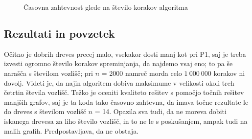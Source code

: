\documentclass[a4paper, 12 pt]{article}
\begin{document}
\begin{figure}[H]
    \centering
    \qquad
    \caption{Časovna zahtevnost glede na število korakov algoritma}
    \label{p2korak}
\end{figure}


\subsection{Rezultati in povzetek}

Očitno je dobrih dreves precej malo, vsekakor dosti manj kot pri P1, saj je treba izvesti ogromno število korakov spreminjanja, da najdemo vsaj eno; to pa še narašča s številom vozlišč; pri $n$ = 2000 namreč morda celo $1 \ 000 \ 000$ korakov ni dovolj. Videti je, da najin algoritem dobiva maksimume v velikosti okoli treh četrtin števila vozlišč. Težko je oceniti kvaliteto rešitev s pomočjo točnih rešitev manjših grafov, saj je ta koda tako časovno zahtevna, da imava točne rezultate le do dreves s številom vozlišč $n$ = 14. Opazila sva tudi, da ne moreva dobiti iskanega drevesa za liho število vozlišč, in to ne le s poskušanjem, ampak tudi na malih grafih. Predpostavljava, da ne obstaja.
\end{document}

